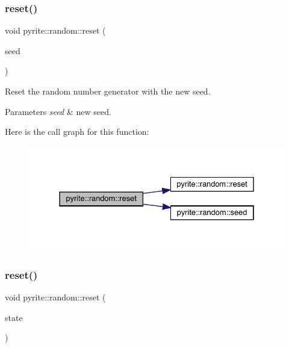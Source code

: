 \subsubsection{\texorpdfstring{reset()}{reset()}\hspace{0.1cm}{\footnotesize\ttfamily [2/3]}}
{\footnotesize\ttfamily void pyrite\+::random\+::reset (\begin{DoxyParamCaption}\item[{\mbox{\hyperlink{classpyrite_1_1random_a936dc9fd106c9b125ccbf3aa6d525e4b}{random\+::seed\+\_\+type}}}]{seed }\end{DoxyParamCaption})}

Reset the random number generator with the new seed.


\begin{DoxyParams}{Parameters}
{\em seed} & new seed. \\
\hline
\end{DoxyParams}
Here is the call graph for this function\+:
\nopagebreak
\begin{figure}[H]
\begin{center}
\leavevmode
\includegraphics[width=331pt]{d2/df9/classpyrite_1_1random_a6d5947d6c425031e81f8488187a332f3_cgraph}
\end{center}
\end{figure}
\mbox{\label{classpyrite_1_1random_a5abed1bb1fbd44ea3e62197a9b11dcd0}} 
\subsubsection{\texorpdfstring{reset()}{reset()}\hspace{0.1cm}{\footnotesize\ttfamily [3/3]}}
{\footnotesize\ttfamily void pyrite\+::random\+::reset (\begin{DoxyParamCaption}\item[{\mbox{\hyperlink{structpyrite_1_1random__state}{random\+\_\+state}} const \&}]{state }\end{DoxyParamCaption})}

